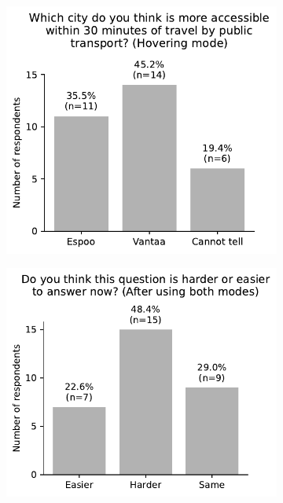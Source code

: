 \begin{appendices}
\begin{minipage}{\textwidth}
\begin{figure}[H]
	\begin{subfigure}[b]{0.5\textwidth}
		\includegraphics[width=\textwidth]{visual/figures/survey/3.pdf}
	\end{subfigure}%
	\hfill
	\begin{subfigure}[b]{0.5\textwidth}
		\includegraphics[width=\textwidth]{visual/figures/survey/4.pdf}
	\end{subfigure}%
\end{figure}
\end{minipage}


\end{appendices}
